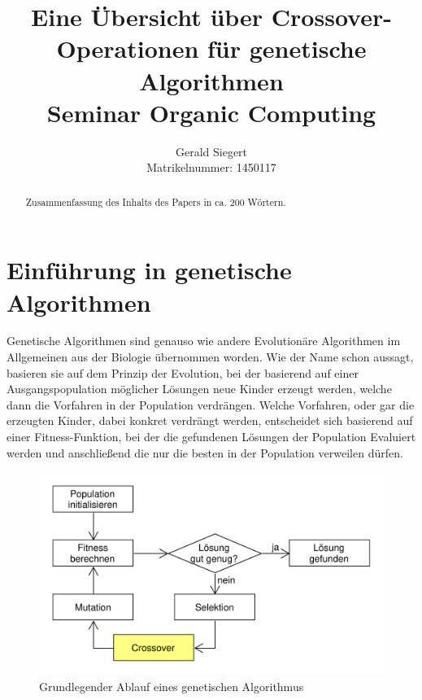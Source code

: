 \documentclass{llncs}
\begin{document}
\mainmatter

\title{Eine Übersicht über Crossover-Operationen für genetische Algorithmen\\Seminar Organic Computing}

\author{Gerald Siegert\\Matrikelnummer: 1450117}
\tocauthor{}


\maketitle


\begin{abstract}
	Zusammenfassung des Inhalts des Papers in ca. 200 Wörtern.
\end{abstract}

\pagebreak

\section{Einführung in genetische Algorithmen}
\label{sec:EinfuhrungGA}

	Genetische Algorithmen sind genauso wie andere Evolutionäre Algorithmen im Allgemeinen aus der Biologie übernommen worden. Wie der Name schon aussagt, basieren sie auf dem Prinzip der Evolution, bei der basierend auf einer Ausgangspopulation möglicher Lösungen neue Kinder erzeugt werden, welche dann die Vorfahren in der Population verdrängen. Welche Vorfahren, oder gar die erzeugten Kinder, dabei konkret verdrängt werden, entscheidet sich basierend auf einer Fitness-Funktion, bei der die gefundenen Lösungen der Population Evaluiert werden und anschließend die nur die besten in der Population verweilen dürfen.
	
	\begin{figure}
		\centering
		\includegraphics[width=.8\columnwidth]{./Figures/GA-Prinzip.pdf}
		\caption{Grundlegender Ablauf eines genetischen Algorithmus}
		\label{fig:abb1}
	\end{figure}	
\end{document}
